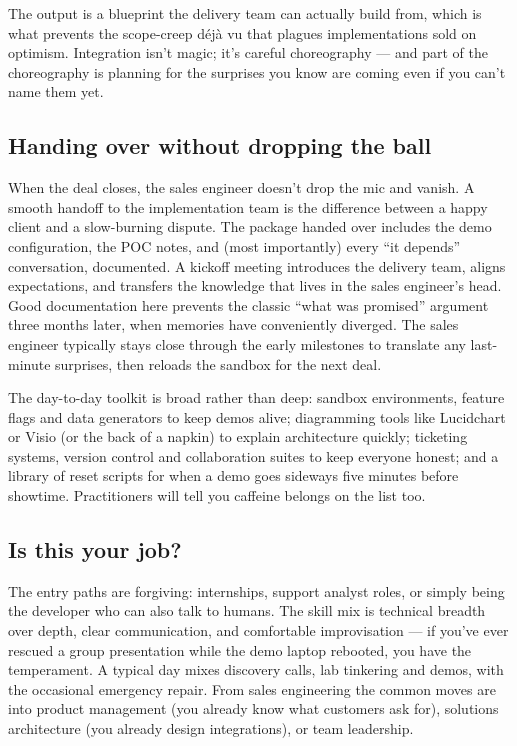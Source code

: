 The output is a blueprint the delivery team can actually build from, which is what prevents the scope-creep déjà vu that plagues implementations sold on optimism. Integration isn't magic; it's careful choreography — and part of the choreography is planning for the surprises you know are coming even if you can't name them yet.



\subsection{Handing over without dropping the ball}


When the deal closes, the sales engineer doesn't drop the mic and vanish. A smooth handoff to the implementation team is the difference between a happy client and a slow-burning dispute. The package handed over includes the demo configuration, the POC notes, and (most importantly) every ``it depends'' conversation, documented. A kickoff meeting introduces the delivery team, aligns expectations, and transfers the knowledge that lives in the sales engineer's head. Good documentation here prevents the classic ``what was promised'' argument three months later, when memories have conveniently diverged. The sales engineer typically stays close through the early milestones to translate any last-minute surprises, then reloads the sandbox for the next deal.


The day-to-day toolkit is broad rather than deep: sandbox environments, feature flags and data generators to keep demos alive; diagramming tools like Lucidchart or Visio (or the back of a napkin) to explain architecture quickly; ticketing systems, version control and collaboration suites to keep everyone honest; and a library of reset scripts for when a demo goes sideways five minutes before showtime. Practitioners will tell you caffeine belongs on the list too.



\subsection{Is this your job?}


The entry paths are forgiving: internships, support analyst roles, or simply being the developer who can also talk to humans. The skill mix is technical breadth over depth, clear communication, and comfortable improvisation — if you've ever rescued a group presentation while the demo laptop rebooted, you have the temperament. A typical day mixes discovery calls, lab tinkering and demos, with the occasional emergency repair. From sales engineering the common moves are into product management (you already know what customers ask for), solutions architecture (you already design integrations), or team leadership.


